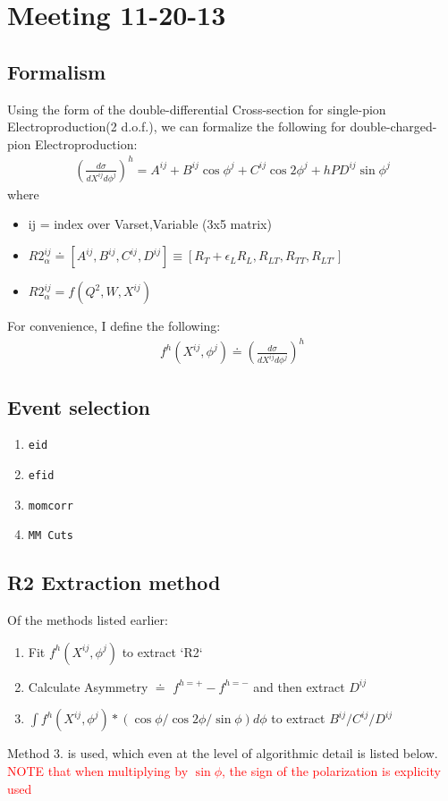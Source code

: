 \documentclass{article}
\newcommand{\code}[1]{\texttt{#1}}
\numberwithin{equation}{subsection}
\begin{document}
\tableofcontents

\section{Meeting 11-20-13}
\subsection{Formalism}
Using the form of the double-differential Cross-section for single-pion Electroproduction(2 d.o.f.), we can formalize the following for double-charged-pion Electroproduction:
\begin{eqnarray}
\left(\frac{d\sigma}{dX^{ij}d\phi^{j}}\right)^{h} = 
A^{ij} +  B^{ij}\cos\phi^{j} + C^{ij}\cos2\phi^{j} + hPD^{ij}\sin\phi^{j}
\end{eqnarray}
where
\begin{itemize}
	\item ij = index over Varset,Variable (3x5 matrix)
	\item $R2^{ij}_{\alpha} \doteq 
	[A^{ij},B^{ij},C^{ij},D^{ij}] \equiv 
	[R_{T}+\epsilon_{L}R_{L}, R_{LT}, R_{TT}, R_{LT'}]$
	\item $R2^{ij}_{\alpha} = f(Q^{2},W,X^{ij})$
\end{itemize}

For convenience, I define the following:
\begin{eqnarray}
f^{h}(X^{ij},\phi^{j}) \doteq \left(\frac{d\sigma}{dX^{ij}d\phi^{j}}\right)^{h}
\end{eqnarray}


\subsection{Event selection}
\begin{enumerate}
	\item \code{eid}
	\item \code{efid}
	\item \code{momcorr}
	\item \code{MM Cuts}
\end{enumerate}

\subsection{R2 Extraction method}
Of the methods listed earlier:
\begin{enumerate}
	\item Fit $f^{h}(X^{ij},\phi^{j})$ to extract `R2`
	\item Calculate Asymmetry $\doteq$ $f^{h=+}-f^{h=-}$ and then extract $D^{ij}$
	\item $\int f^{h}(X^{ij},\phi^{j}) * (\cos\phi/\cos 2\phi/\sin\phi)d\phi$ to extract $B^{ij}/C^{ij}/D^{ij}$
\end{enumerate}
Method 3. is used, which even at the level of algorithmic detail is listed below. \textcolor{red}{NOTE that when multiplying by $\sin\phi$, the sign of the polarization is explicity used}
\end{document}
